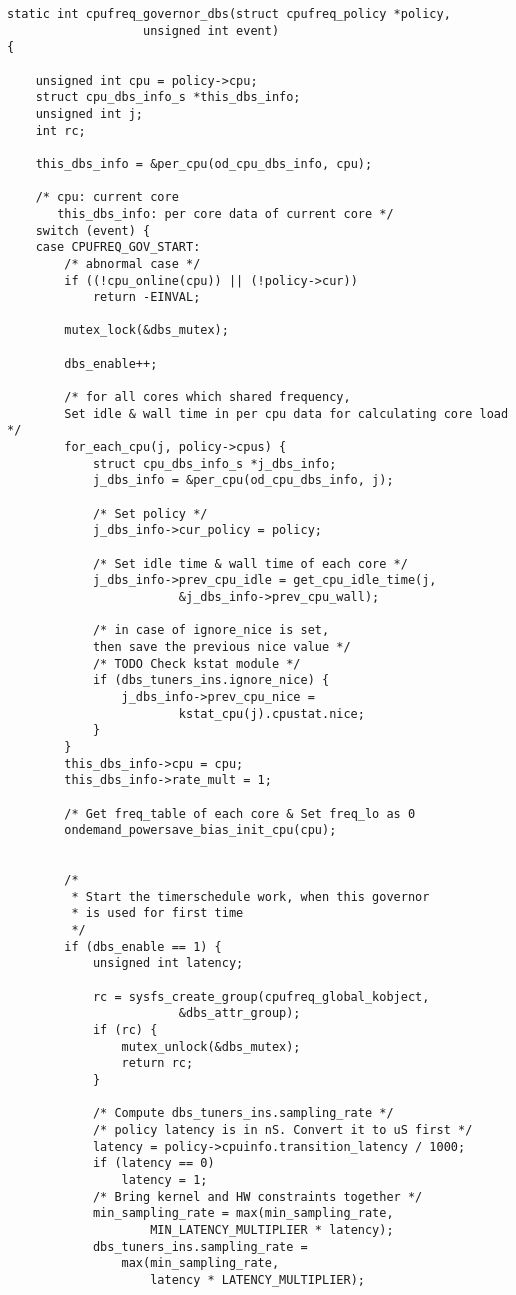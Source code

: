 \begin{lstlisting}
static int cpufreq_governor_dbs(struct cpufreq_policy *policy,
                   unsigned int event)
{

    unsigned int cpu = policy->cpu;
    struct cpu_dbs_info_s *this_dbs_info;
    unsigned int j;
    int rc;

    this_dbs_info = &per_cpu(od_cpu_dbs_info, cpu);

    /* cpu: current core
       this_dbs_info: per core data of current core */
    switch (event) {
    case CPUFREQ_GOV_START:
        /* abnormal case */
        if ((!cpu_online(cpu)) || (!policy->cur))
            return -EINVAL;

        mutex_lock(&dbs_mutex);

        dbs_enable++;

        /* for all cores which shared frequency, 
        Set idle & wall time in per cpu data for calculating core load */
        for_each_cpu(j, policy->cpus) {
            struct cpu_dbs_info_s *j_dbs_info;
            j_dbs_info = &per_cpu(od_cpu_dbs_info, j);

            /* Set policy */
            j_dbs_info->cur_policy = policy;

            /* Set idle time & wall time of each core */
            j_dbs_info->prev_cpu_idle = get_cpu_idle_time(j,
                        &j_dbs_info->prev_cpu_wall);
      
            /* in case of ignore_nice is set, 
            then save the previous nice value */
            /* TODO Check kstat module */
            if (dbs_tuners_ins.ignore_nice) {
                j_dbs_info->prev_cpu_nice =
                        kstat_cpu(j).cpustat.nice;
            }
        }
        this_dbs_info->cpu = cpu;
        this_dbs_info->rate_mult = 1;

        /* Get freq_table of each core & Set freq_lo as 0
        ondemand_powersave_bias_init_cpu(cpu);


        /*
         * Start the timerschedule work, when this governor
         * is used for first time
         */
        if (dbs_enable == 1) {
            unsigned int latency;

            rc = sysfs_create_group(cpufreq_global_kobject,
                        &dbs_attr_group);
            if (rc) {
                mutex_unlock(&dbs_mutex);
                return rc;
            }

            /* Compute dbs_tuners_ins.sampling_rate */
            /* policy latency is in nS. Convert it to uS first */
            latency = policy->cpuinfo.transition_latency / 1000;
            if (latency == 0)
                latency = 1;
            /* Bring kernel and HW constraints together */
            min_sampling_rate = max(min_sampling_rate,
                    MIN_LATENCY_MULTIPLIER * latency);
            dbs_tuners_ins.sampling_rate =
                max(min_sampling_rate,
                    latency * LATENCY_MULTIPLIER);


\end{lstlisting}
